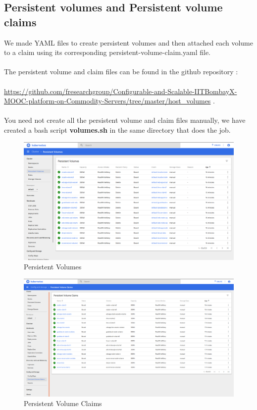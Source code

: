 \documentclass[12pt]{article}
\begin{document}
\subsection{Persistent volumes and Persistent volume claims}
We made YAML files to create persistent volumes and then attached each volume to a claim using its corresponding persistent-volume-claim.yaml file.\\\\
The persistent volume and claim files can be found in the github repository :\\\\ \href{https://github.com/fresearchgroup/Configurable-and-Scalable-IITBombayX-MOOC-platform-on-Commodity-Servers/tree/master/host_volumes}{https://github.com/fresearchgroup/Configurable-and-Scalable-IITBombayX-MOOC-platform-on-Commodity-Servers/tree/master/host\_volumes} \cite{Hostvolumes}. \\\\You need not create all the persistent volume and claim files manually, we have created a bash script \textbf{volumes.sh} in the same directory that does the job. 
\begin{figure}[h!]
	\begin{center}
		\includegraphics[totalheight=0.39\textheight]{PersistentVolume}
		\caption{Persistent Volumes}
	\end{center}
\end{figure}
\begin{figure}[h!]
	\begin{center}
		\includegraphics[totalheight=0.39\textheight]{PersistentVolumeClaim}
		\caption{Persistent Volume Claims}
	\end{center}
\end{figure}
\end{document}
